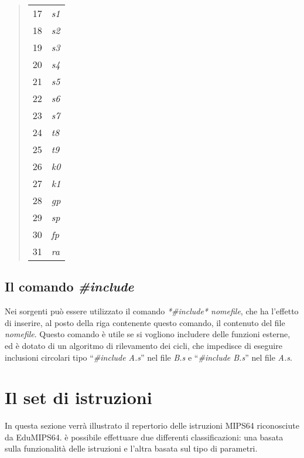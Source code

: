 \documentclass[letterpaper,10pt,italian]{sphinxmanual}
\begin{document}
\begin{quote}
\begin{longtable}{|l|l|}
17
 & 
\emph{s1}
\\

18
 & 
\emph{s2}
\\

19
 & 
\emph{s3}
\\

20
 & 
\emph{s4}
\\

21
 & 
\emph{s5}
\\

22
 & 
\emph{s6}
\\

23
 & 
\emph{s7}
\\

24
 & 
\emph{t8}
\\

25
 & 
\emph{t9}
\\

26
 & 
\emph{k0}
\\

27
 & 
\emph{k1}
\\

28
 & 
\emph{gp}
\\

29
 & 
\emph{sp}
\\

30
 & 
\emph{fp}
\\

31
 & 
\emph{ra}
\\
\hline
\end{longtable}

\end{quote}


\section{Il comando \emph{\#include}}
\label{source-files-format:il-comando-include}
Nei sorgenti può essere utilizzato il comando \emph{*\#include* nomefile}, che ha
l'effetto di inserire, al posto della riga contenente questo comando, il
contenuto del file \emph{nomefile}.
Questo comando è utile se si vogliono includere delle funzioni esterne, ed è
dotato di un algoritmo di rilevamento dei cicli, che impedisce di eseguire
inclusioni circolari tipo ``\emph{\#include A.s}'' nel file \emph{B.s} e
``\emph{\#include B.s}'' nel file \emph{A.s}.


\chapter{Il set di istruzioni}
\label{instructions::doc}\label{instructions:il-set-di-istruzioni}
In questa sezione verrà illustrato il repertorio delle istruzioni MIPS64
riconosciute da EduMIPS64. è possibile effettuare due differenti
classificazioni: una basata sulla funzionalità delle istruzioni e l'altra
basata sul tipo di parametri.
\end{document}
